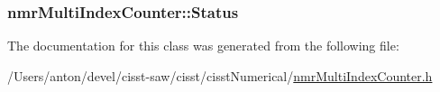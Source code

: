 \subsubsection[{Status}]{ nmr\+Multi\+Index\+Counter\+::\+Status\hspace{0.3cm}{\ttfamily [protected]}}\label{classnmr_multi_index_counter_a0faa71921d5ef62d074493438e3f3e9c}


The documentation for this class was generated from the following file\+:\begin{DoxyCompactItemize}
\item 
/\+Users/anton/devel/cisst-\/saw/cisst/cisst\+Numerical/\hyperlink{nmr_multi_index_counter_8h}{nmr\+Multi\+Index\+Counter.\+h}\end{DoxyCompactItemize}

